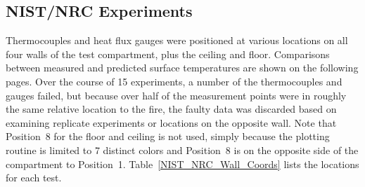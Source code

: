 \clearpage

\subsection{NIST/NRC Experiments}

Thermocouples and heat flux gauges were positioned at various locations on all four walls of the test compartment, plus the ceiling and floor. Comparisons between measured and predicted surface temperatures are shown on the following pages. Over the course of 15 experiments, a number of the thermocouples and gauges failed, but because over half of the measurement points were in roughly the same relative location to the fire, the faulty data was discarded based on examining replicate experiments or locations on the opposite wall. Note that Position~8 for the floor and ceiling is not used, simply because the plotting routine is limited to 7 distinct colors and Position~8 is on the opposite side of the compartment to Position~1. Table~\ref{NIST_NRC_Wall_Coords} lists the locations for each test.

